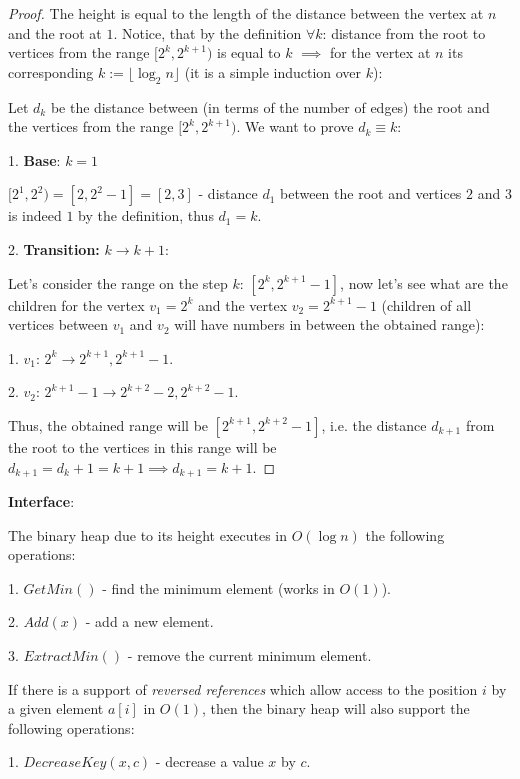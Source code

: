 \begin{proof}

    The height is equal to the length of the distance between the vertex at $n$ and the root at $1$. Notice, that by the definition $\forall k$: distance from the root to vertices from the range $[2^k, 2^{k+1})$ is equal to $k$ $\implies$ for the vertex at $n$ its corresponding $k := \lfloor \log_{2}{n} \rfloor$ (it is a simple induction over $k$):

    Let $d_{k}$ be the distance between (in terms of the number of edges) the root and the vertices from the range $[2^k, 2^{k+1})$. We want to prove $d_{k} \equiv k$:

    1. \textbf{Base}: $k=1$

    $[2^1, 2^{2}) = [2, 2^2-1] = [2, 3]$ - distance $d_{1}$ between the root and vertices $2$ and $3$ is indeed $1$ by the definition, thus $d_{1} = k$.

    2. \textbf{Transition:} $k \to k+1$:

    Let's consider the range on the step $k$: $[2^k, 2^{k+1}-1]$, now let's see what are the children for the vertex $v_1 = 2^k$ and the vertex $v_2 = 2^{k+1}-1$ (children of all vertices between $v_1$ and $v_2$ will have numbers in between the obtained range):

        1. $v_1$: $2^k \to 2^{k+1}, 2^{k+1}-1$.

        2. $v_2$: $2^{k+1}-1 \to 2^{k+2}-2, 2^{k+2}-1$.

        Thus, the obtained range will be $[2^{k+1}, 2^{k+2}-1]$, i.e. the distance $d_{k+1}$ from the root to the vertices in this range will be $d_{k+1} = d_{k} + 1 = k+1 \implies d_{k+1} = k+1$.

\end{proof}

\textbf{Interface}:

The binary heap due to its height executes in $O(\log{n})$ the following operations:

1. $GetMin()$ - find the minimum element (works in $O(1)$).

2. $Add(x)$ - add a new element.

3. $ExtractMin()$ - remove the current minimum element.

If there is a support of \textit{reversed references} which allow access to the position $i$ by a given element $a[i]$ in $O(1)$, then the binary heap will also support the following operations:

1. $DecreaseKey(x, c)$ - decrease a value $x$ by $c$.

